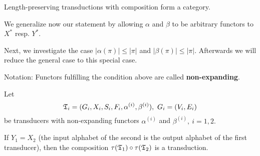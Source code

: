 \medskip
\begin{corollary}
Length-preserving transductions with composition form a category.
\end{corollary}

We generalize now our statement by allowing $\alpha$ and $\beta$ to be arbitrary
functors to $X^*$ resp. $Y^*$.

Next, we investigate the case $|\alpha(\pi)| \leq |\pi|$ and $|\beta(\pi)| \leq
|\pi|$. Afterwards we will reduce the general case to this special case.

Notation: Functors fulfilling the condition above are called {\bf
non-expanding}.

\begin{theorem}
Let
\[ \mbox{$\mathfrak{T}$}_i = (G_i, X_i, S_i, F_i, \alpha^{(i)}, \beta^{(i)}),\ G_i = (V_i,
E_i) \]
be transducers with non-expanding functors $\alpha^{(i)}$ and $\beta^{(i)},\ i =
1,2.$

If $Y_1 = X_2$ (the input alphabet of the second is the output alphabet of the
first transducer), then the composition $\tau(\mbox{$\mathfrak{T}$}_1) \circ \tau(\mbox{$\mathfrak{T}$}_2)$
is a transduction.
\end{theorem}

